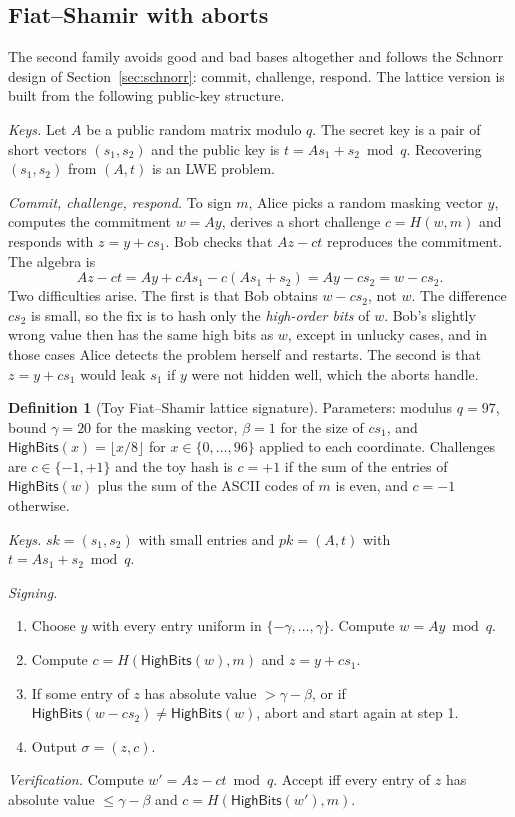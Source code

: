 \documentclass[11pt,a4paper]{article}
\theoremstyle{definition}
\newtheorem{definition}{Definition}[section]
\newcommand{\sk}{\mathit{sk}}
\newcommand{\pk}{\mathit{pk}}
\newcommand{\Hash}{H}
\newcommand{\HB}{\mathsf{HighBits}}
\begin{document}
\subsection{Fiat--Shamir with aborts}

The second family avoids good and bad bases altogether and follows the Schnorr design of Section~\ref{sec:schnorr}: commit, challenge, respond. The lattice version is built from the following public-key structure.

\emph{Keys.} Let $A$ be a public random matrix modulo $q$. The secret key is a pair of short vectors $(s_1,s_2)$ and the public key is $t=As_1+s_2 \bmod q$. Recovering $(s_1,s_2)$ from $(A,t)$ is an LWE problem.

\emph{Commit, challenge, respond.} To sign $m$, Alice picks a random masking vector $y$, computes the commitment $w=Ay$, derives a short challenge $c=\Hash(w,m)$ and responds with $z=y+cs_1$. Bob checks that $Az-ct$ reproduces the commitment. The algebra is
\[
Az-ct=A y+cAs_1-c(As_1+s_2)=Ay-cs_2=w-cs_2 .
\]
Two difficulties arise. The first is that Bob obtains $w-cs_2$, not $w$. The difference $cs_2$ is small, so the fix is to hash only the \emph{high-order bits} of $w$. Bob's slightly wrong value then has the same high bits as $w$, except in unlucky cases, and in those cases Alice detects the problem herself and restarts. The second is that $z=y+cs_1$ would leak $s_1$ if $y$ were not hidden well, which the aborts handle.

\begin{definition}[Toy Fiat--Shamir lattice signature]\label{def:toyfs}
Parameters: modulus $q=97$, bound $\gamma=20$ for the masking vector, $\beta=1$ for the size of $cs_1$, and $\HB(x)=\lfloor x/8\rfloor$ for $x\in\{0,\dots,96\}$ applied to each coordinate. Challenges are $c\in\{-1,+1\}$ and the toy hash is $c=+1$ if the sum of the entries of $\HB(w)$ plus the sum of the ASCII codes of $m$ is even, and $c=-1$ otherwise.

\emph{Keys.} $\sk=(s_1,s_2)$ with small entries and $\pk=(A,t)$ with $t=As_1+s_2 \bmod q$.

\emph{Signing.}
\begin{enumerate}[nosep]
\item Choose $y$ with every entry uniform in $\{-\gamma,\dots,\gamma\}$. Compute $w=Ay \bmod q$.
\item Compute $c=\Hash(\HB(w),m)$ and $z=y+cs_1$.
\item If some entry of $z$ has absolute value $>\gamma-\beta$, or if $\HB(w-cs_2)\ne\HB(w)$, abort and start again at step 1.
\item Output $\sigma=(z,c)$.
\end{enumerate}

\emph{Verification.} Compute $w'=Az-ct \bmod q$. Accept iff every entry of $z$ has absolute value $\le\gamma-\beta$ and $c=\Hash(\HB(w'),m)$.
\end{definition}
\end{document}

